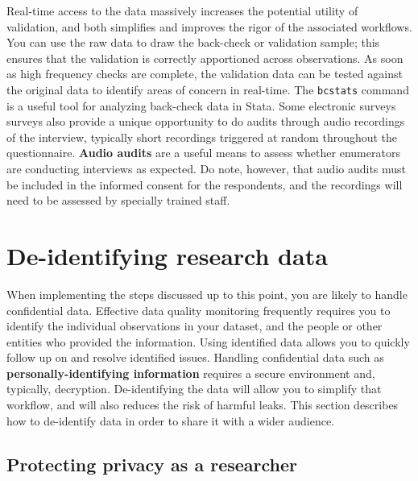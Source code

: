 Real-time access to the data massively increases the potential utility of validation,
and both simplifies and improves the rigor of the associated workflows.
You can use the raw data to draw the back-check or validation sample;
this ensures that the validation is correctly apportioned across observations.
As soon as high frequency checks are complete,
the validation data can be tested against
the original data to identify areas of concern in real-time.
The \texttt{bcstats} command is a useful tool for analyzing back-check data in Stata.
Some electronic surveys surveys also provide a unique opportunity
to do audits through audio recordings of the interview,
typically short recordings triggered at random throughout the questionnaire.
\textbf{Audio audits}
are a useful means to assess whether enumerators are conducting interviews as expected.
Do note, however, that audio audits must be included in the informed consent for the respondents,
and the recordings will need to be assessed by specially trained staff.


\section{De-identifying research data}

When implementing the steps discussed up to this point,
you are likely to handle confidential data.
Effective data quality monitoring
frequently requires you to identify the individual observations in your dataset,
and the people or other entities who provided the information.
Using identified data allows you to quickly follow up on and resolve identified issues.
Handling confidential data such as \textbf{personally-identifying information}
requires a secure environment and, typically, decryption.
De-identifying the data will allow you to simplify that workflow,
and will also reduces the risk of harmful leaks.
This section describes how to de-identify data in order to share it with a wider audience.

\subsection{Protecting privacy as a researcher}

